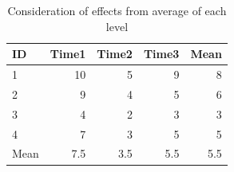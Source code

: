 \begin{table}[ht]
	\centering
	\caption{Consideration of effects from average of each level}
	\begin{tabular}{lrrr|r}
		\hline
		ID   & Time1 & Time2 & Time3 & Mean \\
		\hline
		1    & 10    & 5     & 9     & 8    \\
		2    & 9     & 4     & 5     & 6    \\
		3    & 4     & 2     & 3     & 3    \\
		4    & 7     & 3     & 5     & 5    \\
		\hline
		Mean & 7.5   & 3.5   & 5.5   & 5.5  \\\hline
	\end{tabular}
	\label{tbl::22_06}
\end{table}
